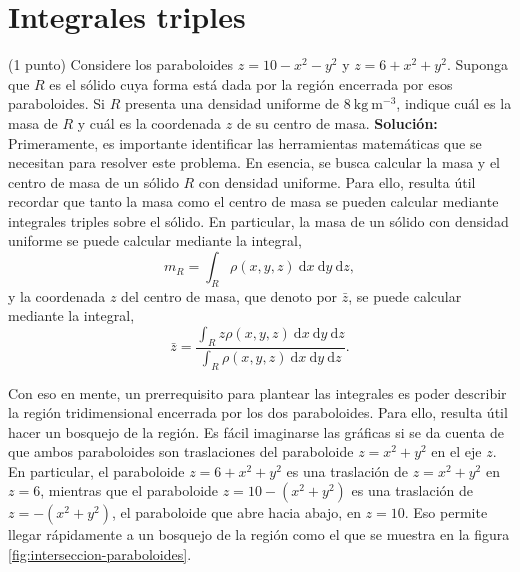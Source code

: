 \documentclass{fmbvecto}
\begin{document}
\section{Integrales triples}

\begin{problema}
    
    (1 punto) Considere los paraboloides \(z = 10 - x^2 - y^2\) y \(z = 6 + x^2 + y^2\). Suponga que \(R\) es el sólido cuya forma está dada por la región encerrada por esos paraboloides. Si \(R\) presenta una densidad uniforme de \(8 \: \text{kg} \: \text{m}^{-3}\), indique cuál es la masa de \(R\) y cuál es la coordenada \(z\) de su centro de masa.
\tcblower
\textbf{Solución:}\\

Primeramente, es importante identificar las herramientas matemáticas que se necesitan para resolver este problema. En esencia, se busca calcular la masa y el centro de masa de un sólido \(R\) con densidad uniforme. Para ello, resulta útil recordar que tanto la masa como el centro de masa se pueden calcular mediante integrales triples sobre el sólido. En particular, la masa de un sólido con densidad uniforme se puede calcular mediante la integral,
\[m_R = \int_{R} \rho(x,y,z) \: \mathrm{d}x \: \mathrm{d}y \: \mathrm{d}z,\]
y la coordenada \(z\) del centro de masa, que denoto por \(\bar{z}\), se puede calcular mediante la integral,
\[\bar{z} = \frac{\int_{R} z\rho(x,y,z) \: \mathrm{d}x \: \mathrm{d}y \: \mathrm{d}z}{\int_{R} \rho(x,y,z) \: \mathrm{d}x \: \mathrm{d}y \: \mathrm{d}z}.\]
\vspace*{1em}

Con eso en mente, un prerrequisito para plantear las integrales es poder describir la región tridimensional encerrada por los dos paraboloides. Para ello, resulta útil hacer un bosquejo de la región. Es fácil imaginarse las gráficas si se da cuenta de que ambos paraboloides son traslaciones del paraboloide \(z = x^2 + y^2\) en el eje \(z\). En particular, el paraboloide \(z = 6 + x^2 + y^2\) es una traslación de \(z = x^2 + y^2\) en \(z = 6\), mientras que el paraboloide \(z = 10 - (x^2 + y^2)\) es una traslación de \(z = -(x^2 + y^2)\), el paraboloide que abre hacia abajo, en \(z = 10\). Eso permite llegar rápidamente a un bosquejo de la región como el que se muestra en la figura \ref{fig:interseccion-paraboloides}.


\end{problema}
\end{document}
